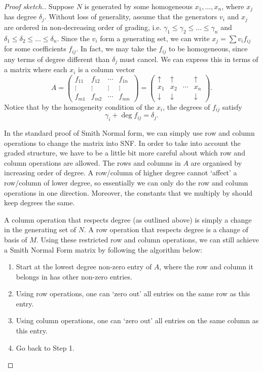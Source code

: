 \begin{proof}[Proof sketch.]
    Suppose \(N\) is generated by some homogeneous \(x_1,\dots,x_n\), where \(x_j\) has degree \(\delta_j\). Without loss of generality, assume that the generators \(v_i\) and \(x_j\) are ordered in non-decreasing order of grading, i.e. \(\gamma_1\leq \gamma_2\leq \dots \leq \gamma_n\) and  \(\delta_1\leq \delta_2\leq \dots \leq \delta_n\). Since the \(v_i\) form a generating set, we can write \(x_j=\sum v_if_{ij}\) for some coefficients $f_{ij}$. In fact, we may take the $f_{ij}$ to be homogeneous, since any terms of degree different than $\delta_j$ must cancel. We can express this in terms of a matrix where each \(x_i\) is a column vector
    \[
    A =
    \begin{pmatrix}
        f_{11} & f_{12} & \cdots & f_{1n}\\
        \vdots & \vdots & \vdots & \vdots\\
        f_{m1} & f_{m2} & \cdots & f_{mn}
    \end{pmatrix}
    =
    \begin{pmatrix}
        \uparrow & \uparrow & & \uparrow\\
        x_1 & x_2 & \cdots & x_n\\
        \downarrow & \downarrow & & \downarrow
    \end{pmatrix}.
    \]
    Notice that by the homogeneity condition of the \(x_i\), the degrees of \(f_{ij}\) satisfy
    \[\gamma_i +\deg f_{ij}= \delta_j.\]

    In the standard proof of Smith Normal form, we can simply use row and column operations to change the matrix into SNF. In order to take into account the graded structure, we have to be a little bit more careful about which row and column operations are allowed.
    The rows and columns in \(A\) are organised by increasing order of degree. A row/column of higher degree cannot `affect' a row/column of lower degree, so essentially we can only do the row and column operations in one direction. Moreover, the constants that we multiply by should keep degrees the same. 
    
    A column operation that respects degree (as outlined above) is simply a change in the generating set of \(N\). A row operation that respects degree is a change of basis of \(M\). Using these restricted row and column operations, we can still achieve a Smith Normal Form matrix by following the algorithm below:

    \begin{enumerate}
        \item Start at the lowest degree non-zero entry of \(A\), where the row and column it belongs in has other non-zero entries.
        \item Using row operations, one can `zero out' all entries on the same row as this entry.
        \item Using column operations, one can `zero out' all entries on the same column as this entry. 
        \item Go back to Step 1.
    \end{enumerate}


\end{proof}
